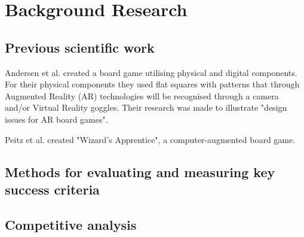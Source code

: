 \chapter{Background Research}\label{ch:bgres}

\section{Previous scientific work}
Andersen et al. \citep{andersen_designing_2004} created a board game utilising physical and digital components. For their physical components they used flat squares with patterns that through Augmented Reality (AR) technologies will be recognised through a camera and/or Virtual Reality goggles. Their research was made to illustrate "design issues for AR board games".

Peitz et al. \citep{peitzWizards2006} created "Wizard's Apprentice", a computer-augmented board game. 

\section{Methods for evaluating and measuring key success criteria}


\section{Competitive analysis}
